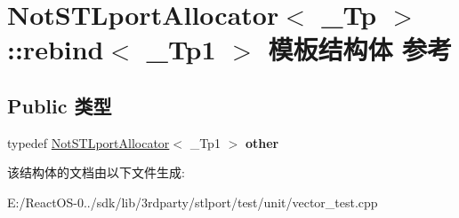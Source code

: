 \hypertarget{struct_not_s_t_lport_allocator_1_1rebind}{}\section{Not\+S\+T\+Lport\+Allocator$<$ \+\_\+\+Tp $>$\+:\+:rebind$<$ \+\_\+\+Tp1 $>$ 模板结构体 参考}
\label{struct_not_s_t_lport_allocator_1_1rebind}
\subsection*{Public 类型}
\begin{DoxyCompactItemize}
\item 
\mbox{\label{struct_not_s_t_lport_allocator_1_1rebind_abd1fb33175e2fa96a0e9f4d83c9da496}} 
typedef \hyperlink{struct_not_s_t_lport_allocator}{Not\+S\+T\+Lport\+Allocator}$<$ \+\_\+\+Tp1 $>$ {\bfseries other}
\end{DoxyCompactItemize}


该结构体的文档由以下文件生成\+:\begin{DoxyCompactItemize}
\item 
E\+:/\+React\+O\+S-\/0../sdk/lib/3rdparty/stlport/test/unit/vector\+\_\+test.\+cpp\end{DoxyCompactItemize}
